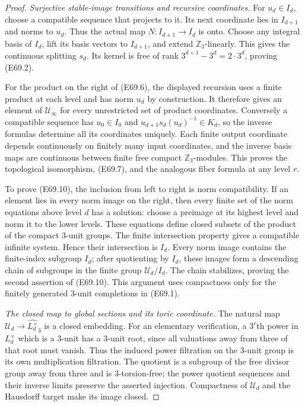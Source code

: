 \begin{proof}
\emph{Surjective stable-image transitions and recursive coordinates.}
For $u_d\in I_d$, choose a compatible sequence that projects to it.
Its next coordinate lies in $I_{d+1}$ and norms to $u_d$.
Thus the actual map $N:I_{d+1}\to I_d$ is onto.
Choose any integral basis of $I_d$, lift its basis vectors to
$I_{d+1}$, and extend $\mathbb Z_3$-linearly. This gives the continuous
splitting $s_d$. Its kernel is free of rank
$3^{d+1}-3^d=2\cdot3^d$, proving (E69.2).

For the product on the right of (E69.6), the displayed recursion
uses a finite product at each level and has norm $u_d$ by construction.
It therefore gives an element of $\mathcal U_\infty$ for every
unrestricted set of product coordinates.
Conversely a compatible sequence has $u_0\in I_0$ and
$u_{d+1}s_d(u_d)^{-1}\in K_d$, so the inverse formulas determine
all its coordinates uniquely.
Each finite output coordinate depends continuously on finitely
many input coordinates, and the inverse basis maps are continuous
between finite free compact $\mathbb Z_3$-modules.
This proves the topological isomorphism, (E69.7), and the analogous
fiber formula at any level $r$.

To prove (E69.10), the inclusion from left to right is norm
compatibility. If an element lies in every norm image on the right,
then every finite set of the norm equations above level $d$ has a
solution: choose a preimage at its highest level and norm it to
the lower levels. These equations define closed subsets of the
product of the compact $3$-unit groups. The finite intersection
property gives a compatible infinite system.
Hence their intersection is $I_d$.
Every norm image contains the finite-index subgroup $I_d$; after
quotienting by $I_d$, these images form a descending chain of
subgroups in the finite group $\mathcal U_d/I_d$.
The chain stabilizes, proving the second assertion of (E69.10).
This argument uses compactness only for the finitely generated
$3$-unit completions in (E69.1).

\emph{The closed map to global sections and its toric coordinate.}
The natural map
$\mathcal U_d\to\widehat{L_d^\times}_3$ is a closed embedding.
For an elementary verification, a $3^r$th power in $L_d^\times$
which is a $3$-unit has a $3$-unit root, since all valuations away
from three of that root must vanish.
Thus the induced power filtration on the $3$-unit group is its
own multiplication filtration. The quotient is a subgroup of the
free divisor group away from three and is $3$-torsion-free;
the power quotient sequences and their inverse limits preserve
the asserted injection. Compactness of $\mathcal U_d$ and the
Hausdorff target make its image closed.


\end{proof}
